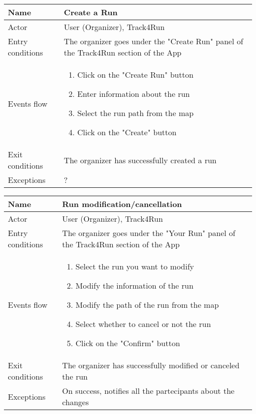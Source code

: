 \begin{table}[]
\begin{tabular}{|l|l|}
\hline
Name             & Create a Run \\ \hline
Actor            & User (Organizer), Track4Run \\ \hline
Entry conditions & The organizer goes under the "Create Run" panel of the Track4Run section of the App \\ \hline
Events flow      & \begin{enumerate}
\item Click on the "Create Run" button
\item Enter information about the run
\item Select the run path from the map
\item Click on the "Create" button
\end{enumerate} \\ \hline
Exit conditions  & The organizer has successfully created a run \\ \hline
Exceptions       & ?\\ \hline
\end{tabular}
\end{table}

\begin{table}[]
\begin{tabular}{|l|l|}
\hline
Name             & Run modification/cancellation \\ \hline
Actor            & User (Organizer), Track4Run \\ \hline
Entry conditions & The organizer goes under the "Your Run" panel of the Track4Run section of the App \\ \hline
Events flow      & \begin{enumerate}
\item Select the run you want to modify
\item Modify the information of the run
\item Modify the path of the run from the map
\item Select whether to cancel or not the run
\item Click on the "Confirm" button
\end{enumerate} \\ \hline
Exit conditions  & The organizer has successfully modified or canceled the run \\ \hline
Exceptions       & On success, notifies all the partecipants about the changes\\ \hline
\end{tabular}
\end{table}

